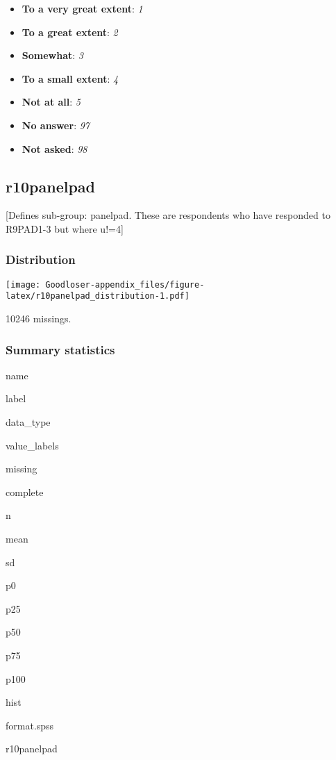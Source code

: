 \documentclass[]{book}
\providecommand{\tightlist}{%
  \setlength{\itemsep}{0pt}\setlength{\parskip}{0pt}}
\begin{document}
\begin{itemize}
\tightlist
\item
  \textbf{To a very great extent}: \emph{1}
\item
  \textbf{To a great extent}: \emph{2}
\item
  \textbf{Somewhat}: \emph{3}
\item
  \textbf{To a small extent}: \emph{4}
\item
  \textbf{Not at all}: \emph{5}
\item
  \textbf{No answer}: \emph{97}
\item
  \textbf{Not asked}: \emph{98}
\end{itemize}

\subsection{r10panelpad}\label{r10panelpad}

{[}Defines sub-group: panelpad. These are respondents who have responded
to R9PAD1-3 but where u!=4{]}

\subsubsection{Distribution}\label{r10panelpad_distribution}

\texttt{[image: Goodloser-appendix\_files/figure-latex/r10panelpad\_distribution-1.pdf]}

10246 missings.

\subsubsection{Summary statistics}\label{r10panelpad_summary}

name

label

data\_type

value\_labels

missing

complete

n

mean

sd

p0

p25

p50

p75

p100

hist

format.spss

r10panelpad
\end{document}
